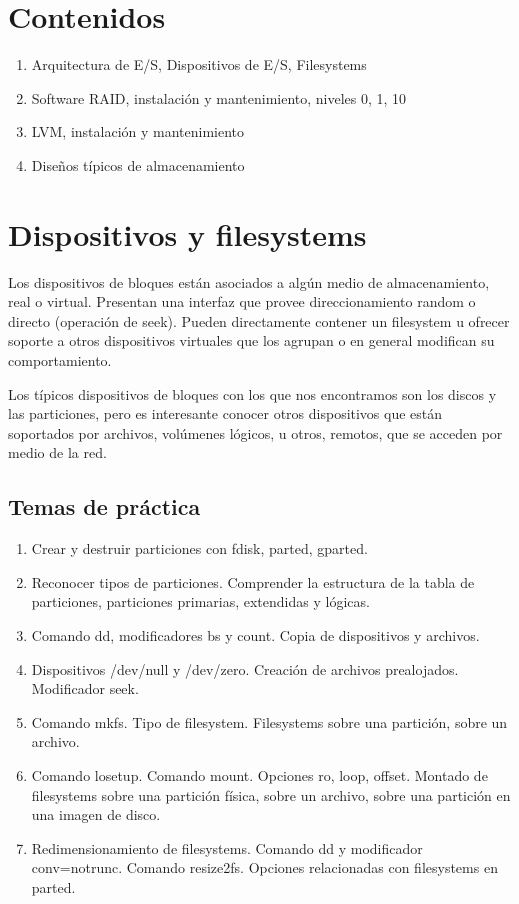 
\section {Contenidos}

\begin{enumerate}
	\item Arquitectura de E/S, Dispositivos de E/S, Filesystems
	\item	Software RAID, instalación y mantenimiento, niveles 0, 1, 10
	\item	LVM, instalación y mantenimiento
	\item	Diseños típicos de almacenamiento
\end{enumerate}

\section{Dispositivos y filesystems}
Los dispositivos de bloques están asociados a algún medio de almacenamiento, real o virtual. Presentan una interfaz que provee direccionamiento random o directo (operación de seek). Pueden directamente contener un filesystem u ofrecer soporte a otros dispositivos virtuales que los agrupan o en general modifican su comportamiento.


Los típicos dispositivos de bloques con los que nos encontramos son los discos y las particiones, pero es interesante conocer otros dispositivos que están soportados por archivos, volúmenes lógicos, u otros, remotos, que se acceden por medio de la red. 

\subsection{Temas de práctica}
\begin{enumerate}
	\item Crear y destruir particiones con fdisk, parted, gparted. 
	\item Reconocer tipos de particiones. Comprender la estructura de la tabla de particiones, particiones primarias, extendidas y lógicas.
	\item Comando dd, modificadores bs y count. Copia de dispositivos y archivos.
	\item Dispositivos /dev/null y /dev/zero. Creación de archivos prealojados. Modificador seek. 
	\item Comando mkfs. Tipo de filesystem. Filesystems sobre una partición, sobre un archivo.
	\item Comando losetup. Comando mount. Opciones ro, loop, offset. Montado de filesystems sobre una partición física, sobre un archivo, sobre una partición en una imagen de disco.
	\item Redimensionamiento de filesystems. Comando dd y modificador conv=notrunc. Comando resize2fs. Opciones relacionadas con filesystems en parted.
\end{enumerate}

